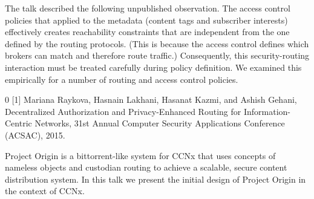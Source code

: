 \documentclass[a4paper,UKenglish]{dagrep}
\begin{document}
The talk described the following unpublished observation. The access control policies that applied to the metadata (content tags and subscriber interests) effectively creates reachability constraints that are independent from the one defined by the routing protocols. (This is because the access control defines which brokers can match and therefore route traffic.) Consequently, this security-routing interaction must be treated carefully during policy definition. We examined this empirically for a number of routing and access control policies.

\begin{thebibliography}{0}
[1] Mariana Raykova, Hasnain Lakhani, Hasanat Kazmi, and Ashish Gehani, Decentralized Authorization and Privacy-Enhanced Routing for Information-Centric Networks, 31st Annual Computer Security Applications Conference (ACSAC), 2015.
\end{thebibliography}

\license

Project Origin is a bittorrent-like system for CCNx that uses concepts of nameless objects and custodian routing to achieve a scalable, secure content distribution system. In this talk we present the initial design of Project Origin in the context of CCNx.

\license
\end{document}

